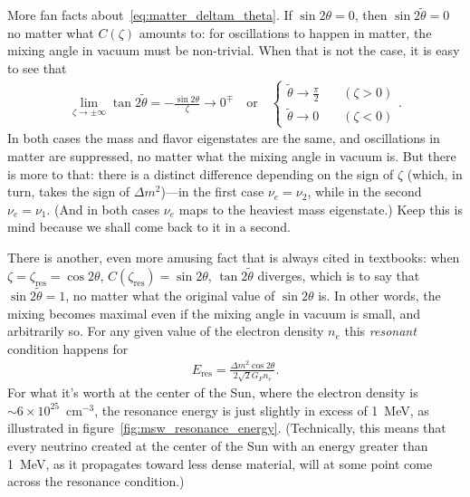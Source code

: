 More fan facts about~\eqref{eq:matter_deltam_theta}. If $\sin 2\theta = 0$, then
$\sin 2\tilde{\theta} = 0$ no matter what $C(\zeta)$ amounts to: for oscillations
to happen in matter, the mixing angle in vacuum must be non-trivial.
When that is not the case, it is easy to see that
\begin{align*}
  \lim_{\zeta \rightarrow \pm \infty} \tan 2\tilde{\theta} =
  -\frac{\sin 2\theta}{\zeta} \rightarrow 0^\mp
  \quad\text{or}\quad
  \begin{cases}
    \tilde{\theta} \rightarrow \frac{\pi}{2} & \quad (\zeta > 0)\\
    \tilde{\theta} \rightarrow 0 & \quad (\zeta < 0)
  \end{cases}.
\end{align*}
In both cases the mass and flavor eigenstates are the same, and oscillations in
matter are suppressed, no matter what the mixing angle in vacuum is. But there is
more to that: there is a distinct difference depending on the sign of $\zeta$ (which,
in turn, takes the sign of $\Delta m^2$)---in the first case $\nu_e = \nu_2$, while in
the second $\nu_e = \nu_1$. (And in both cases $\nu_e$ maps to the heaviest mass
eigenstate.) Keep this is mind because we shall come back to it in a second.

There is another, even more amusing fact that is always cited in textbooks:
when $\zeta = \zeta_\text{res} = \cos 2\theta$,
$C(\zeta_\text{res}) = \sin 2\theta$, $\tan 2\tilde{\theta}$ diverges, which is
to say that $\sin 2\tilde{\theta} = 1$, no matter what the original value of
$\sin 2\theta$ is.
In other words, the mixing becomes maximal even if the mixing angle in vacuum is
small, and arbitrarily so. For any given value of the electron density $n_e$ this
\emph{resonant} condition happens for
\begin{align}\label{eq:msw_resonance_energy}
  E_\text{res} = \frac{\Delta m^2 \cos 2\theta}{2\sqrt{2}G_F n_e}.
\end{align}
For what it's worth at the center of the Sun, where the electron density is
$\sim 6 \times 10^{25}$~cm$^{-3}$, the resonance energy is just slightly in excess
of 1~MeV, as illustrated in figure~\ref{fig:msw_resonance_energy}.
(Technically, this means that every neutrino created at the center of the Sun with
an energy greater than 1~MeV, as it propagates toward less dense material, will at
some point come across the resonance condition.)

